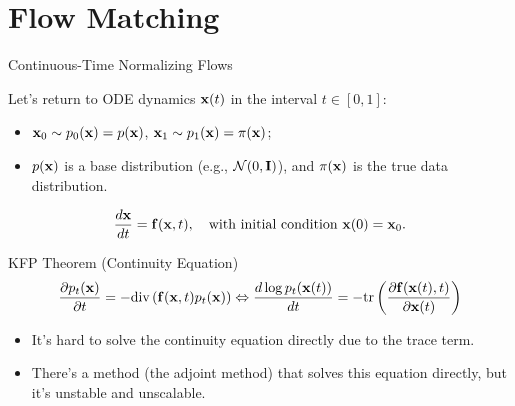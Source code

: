 \documentclass{beamer}
\begin{document}
\section{Flow Matching}
\begin{frame}{Continuous-Time Normalizing Flows}

	Let's return to ODE dynamics $\mathbf{x}(t)$ in the interval $t \in [0, 1]$:
	\begin{itemize}
	\item $\mathbf{x}_0 \sim p_0(\mathbf{x}) = p(\mathbf{x})$, $\mathbf{x}_1 \sim p_1(\mathbf{x}) =  \pi(\mathbf{x})$;
	\item $p(\mathbf{x})$ is a base distribution (e.g., $\mathcal{N}(0, \mathbf{I})$), and $\pi(\mathbf{x})$ is the true data distribution.
	\end{itemize}
	\[
		\frac{d \mathbf{x}}{dt} = \mathbf{f} (\mathbf{x}, t),  \quad \text{with initial condition } \mathbf{x}(0) = \mathbf{x}_0.
	\]
	\vspace{-0.3cm}
	\begin{block}{KFP Theorem (Continuity Equation)}
		\vspace{-0.5cm}
		\[
			\frac{\partial p_t(\mathbf{x})}{\partial t} = - \text{div}\left(\mathbf{f}(\mathbf{x}, t) p_t(\mathbf{x})\right) \Leftrightarrow \frac{d \log p_t(\mathbf{x}(t))}{d t} = - \text{tr} \left( \frac{\partial \mathbf{f}(\mathbf{x}(t), t)}{\partial \mathbf{x}(t)} \right)
		\]
		\vspace{-0.3cm}
	\end{block}
	\begin{itemize}
		\item It's hard to solve the continuity equation directly due to the trace term.
		\item There's a method (the adjoint method) that solves this equation directly, but it's unstable and unscalable.
	\end{itemize}
\end{frame}
\end{document}
